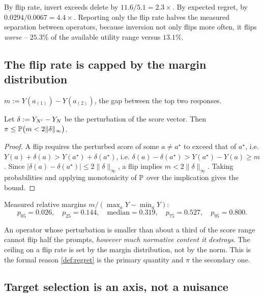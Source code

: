 \begin{corollary}
By flip rate, invert exceeds delete by $11.6/5.1 = 2.3\times$. By expected
regret, by $0.0294/0.0067 = 4.4\times$. Reporting only the flip rate halves the
measured separation between operators, because inversion not only flips more
often, it flips \emph{worse} -- $25.3\%$ of the available utility range versus
$13.1\%$.
\end{corollary}

\subsection{The flip rate is capped by the margin distribution}

\begin{definition}[Margin]
$m := Y(a_{(1)}) - Y(a_{(2)})$, the gap between the top two responses.
\end{definition}

\begin{proposition}
\label{prop:cap}
Let $\delta := Y_{N'} - Y_{N}$ be the perturbation of the score vector. Then
$\pi \le \mathbb{P}\big(m < 2\|\delta\|_\infty\big)$.
\end{proposition}
\begin{proof}
A flip requires the perturbed score of some $a\neq a^\star$ to exceed that of
$a^\star$, i.e.
$Y(a)+\delta(a) > Y(a^\star)+\delta(a^\star)$, i.e.
$\delta(a)-\delta(a^\star) > Y(a^\star)-Y(a) \ge m$.
Since $|\delta(a)-\delta(a^\star)| \le 2\|\delta\|_\infty$, a flip implies
$m < 2\|\delta\|_\infty$. Taking probabilities and applying monotonicity of
$\mathbb{P}$ over the implication gives the bound.
\end{proof}

Measured relative margins $m/(\max_a Y - \min_a Y)$:
\[
p_{05}=0.026,\quad p_{25}=0.144,\quad \text{median}=0.319,\quad p_{75}=0.527,\quad p_{95}=0.800.
\]

\begin{corollary}
An operator whose perturbation is smaller than about a third of the score range
cannot flip half the prompts, \emph{however much normative content it destroys}.
The ceiling on a flip rate is set by the margin distribution, not by the norm.
This is the formal reason \cref{def:regret} is the primary quantity and $\pi$ the
secondary one.
\end{corollary}

\subsection{Target selection is an axis, not a nuisance}
\label{rem:target}

